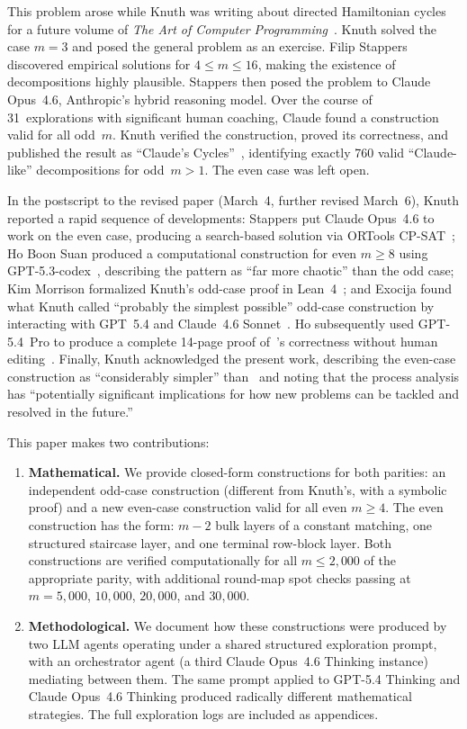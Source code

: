 \documentclass[11pt]{article}
\theoremstyle{definition}
\theoremstyle{remark}
\begin{document}
This problem arose while Knuth was writing about directed Hamiltonian cycles for a future volume of \emph{The Art of Computer Programming}~\cite{knuth-taocp4a}. Knuth solved the case $m = 3$ and posed the general problem as an exercise. Filip Stappers discovered empirical solutions for $4 \leq m \leq 16$, making the existence of decompositions highly plausible. Stappers then posed the problem to Claude Opus~4.6, Anthropic's hybrid reasoning model. Over the course of 31~explorations with significant human coaching, Claude found a construction valid for all odd~$m$. Knuth verified the construction, proved its correctness, and published the result as ``Claude's Cycles''~\cite{knuth2026}, identifying exactly 760 valid ``Claude-like'' decompositions for odd~$m > 1$. The even case was left open.

In the postscript to the revised paper (March~4, further revised March~6), Knuth reported a rapid sequence of developments: Stappers put Claude Opus~4.6 to work on the even case, producing a search-based solution via ORTools CP-SAT~\cite{knuth-even-solution}; Ho Boon Suan produced a computational construction for even $m \geq 8$ using GPT-5.3-codex~\cite{knuth-even-closed}, describing the pattern as ``far more chaotic'' than the odd case; Kim Morrison formalized Knuth's odd-case proof in Lean~4~\cite{morrison-lean}; and Exocija found what Knuth called ``probably the simplest possible'' odd-case construction by interacting with GPT~5.4 and Claude~4.6 Sonnet~\cite{exocija2026}. Ho subsequently used GPT-5.4~Pro to produce a complete 14-page proof of~\cite{knuth-even-closed}'s correctness without human editing~\cite{ho-proof}. Finally, Knuth acknowledged the present work, describing the even-case construction as ``considerably simpler'' than~\cite{knuth-even-closed} and noting that the process analysis has ``potentially significant implications for how new problems can be tackled and resolved in the future.''

This paper makes two contributions:
\begin{enumerate}[label=(\roman*)]
    \item \textbf{Mathematical.} We provide closed-form constructions for both parities: an independent odd-case construction (different from Knuth's, with a symbolic proof) and a new even-case construction valid for all even $m \geq 4$. The even construction has the form: $m-2$ bulk layers of a constant matching, one structured staircase layer, and one terminal row-block layer. Both constructions are verified computationally for all $m \leq 2{,}000$ of the appropriate parity, with additional round-map spot checks passing at $m = 5{,}000$, $10{,}000$, $20{,}000$, and $30{,}000$.
    \item \textbf{Methodological.} We document how these constructions were produced by two LLM agents operating under a shared structured exploration prompt, with an orchestrator agent (a third Claude Opus~4.6 Thinking instance) mediating between them. The same prompt applied to GPT-5.4 Thinking and Claude Opus~4.6 Thinking produced radically different mathematical strategies. The full exploration logs are included as appendices.
\end{enumerate}
\end{document}
